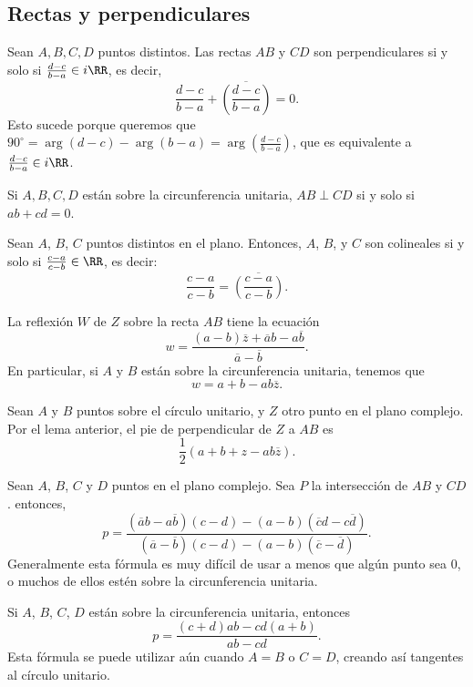 \documentclass[11pt]{scrartcl}
\begin{document}
\subsection{Rectas y perpendiculares}

\begin{lemma}[Perpendicularidad]
Sean $A,B,C,D$ puntos distintos. Las rectas $AB$ y $CD$ son perpendiculares si y solo si $\frac{d-c}{b-a}\in i\RR$, es decir, 
\[\frac{d-c}{b-a} + \overline{\left(\frac{d-c}{b-a}\right)} = 0.\]
Esto sucede porque queremos que $90^{\circ}=\arg(d-c) - \arg(b-a) = \arg\left(\frac{d-c}{b-a}\right)$, que es equivalente a $\frac{d-c}{b-a}\in i\RR$. 

Si $A, B, C, D$ están sobre la circunferencia unitaria, $AB\perp CD$ si y solo si $ab+cd = 0$.
\end{lemma}

\begin{lemma}[Colinealidad]
Sean $A$, $B$, $C$ puntos distintos en el plano. Entonces, $A$, $B$, y $C$ son colineales si y solo si $\frac{c-a}{c-b}\in \RR$, es decir:
\[\frac{c-a}{c-b} = \overline{\left(\frac{c-a}{c-b}\right)}.\]
\end{lemma}

\begin{lemma}
La reflexión $W$ de $Z$ sobre la recta $AB$ tiene la ecuación
\[w = \frac{(a-b)\overline{z}+\overline{a}b-a\overline{b}}{\overline{a}-\overline{b}}.\]
En particular, si $A$ y $B$ están sobre la circunferencia unitaria, tenemos que 
\[w = a+b-ab\overline{z}.\]
\end{lemma}

\begin{lemma}
Sean $A$ y $B$ puntos sobre el círculo unitario, y $Z$ otro punto en el plano complejo. Por el lema anterior, el pie de perpendicular de $Z$ a $AB$ es 
\[\frac{1}{2}(a+b+z-ab\overline{z}).\]
\end{lemma}

\begin{lemma}
Sean $A$, $B$, $C$ y $D$ puntos en el plano complejo. Sea $P$ la intersección de $AB$ y $CD$. entonces, 
\[p = \frac{(\overline ab-a\overline b)(c-d)-(a-b)(\overline cd-c\overline d)}{(\overline a-\overline b)(c-d)-(a-b)(\overline c-\overline d)}.\]
Generalmente esta fórmula es muy difícil de usar a menos que algún punto sea 0, o muchos de ellos estén sobre la circunferencia unitaria.

Si $A$, $B$, $C$, $D$ están sobre la circunferencia unitaria, entonces
\[p = \frac{(c+d)ab-cd(a+b)}{ab-cd}.\]
Esta fórmula se puede utilizar aún cuando $A = B$ o $C = D$, creando así tangentes al círculo unitario.
\end{lemma}
\end{document}
